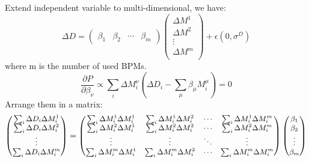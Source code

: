 Extend independent variable to multi-dimensional, we have:
\begin{equation}
    \Delta D = \begin{pmatrix} \beta_1 & \beta_2 & \cdots & \beta_m \end{pmatrix} 
	\begin{pmatrix}
	    \Delta M^1	\\
	    \Delta M^2	\\
	    \vdots 	\\
	    \Delta M^m	\\
	\end{pmatrix}
	+ \epsilon(0, \sigma^D)
\end{equation}
where m is the number of used BPMs.
\begin{equation}
    \frac{\partial P}{\partial \beta_\nu} \propto \sum_i \Delta M_i^\nu (\Delta D_i - \sum_\mu \beta_\mu M_i^\mu) = 0
\end{equation}
Arrange them in a matrix:
\begin{equation}
    \small
    \begin{pmatrix}
	\sum_i \Delta D_i \Delta M_i^1 \\
	\sum_i \Delta D_i \Delta M_i^2 \\
	\vdots	\\
	\sum_i \Delta D_i \Delta M_i^m \\
    \end{pmatrix}
    = 
    \begin{pmatrix}
	\sum_i \Delta M_i^1 \Delta M_i^1    & \sum_i \Delta M_i^1 \Delta M_i^2	&
	\cdots	& \sum_i \Delta M_i^1 \Delta M_i^m  \\
	\sum_i \Delta M_i^2 \Delta M_i^1    & \sum_i \Delta M_i^2 \Delta M_i^2	&
	\cdots	& \sum_i \Delta M_i^2 \Delta M_i^m  \\
	\vdots	& \vdots    & \ddots	& \vdots    \\
	\sum_i \Delta M_i^m \Delta M_i^1    & \sum_i \Delta M_i^m \Delta M_i^2	&
	\cdots	& \sum_i \Delta M_i^m \Delta M_i^m  \\
    \end{pmatrix}
    \begin{pmatrix}
	\beta_1 \\
	\beta_2 \\
	\vdots	\\
	\beta_m \\ 
    \end{pmatrix}
\end{equation}

